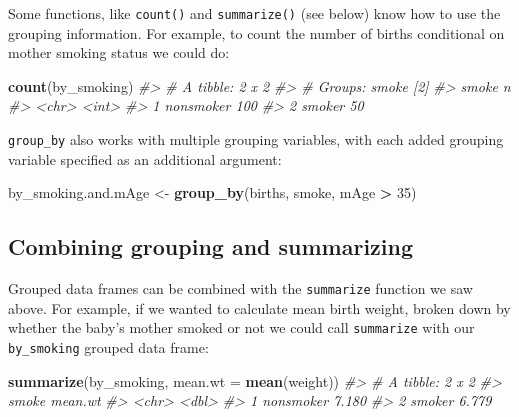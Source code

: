\documentclass[]{book}
\newenvironment{Shaded}{\begin{snugshade}}{\end{snugshade}}
\newcommand{\CommentTok}[1]{\textcolor[rgb]{0.56,0.35,0.01}{\textit{#1}}}
\newcommand{\DataTypeTok}[1]{\textcolor[rgb]{0.13,0.29,0.53}{#1}}
\newcommand{\DecValTok}[1]{\textcolor[rgb]{0.00,0.00,0.81}{#1}}
\newcommand{\KeywordTok}[1]{\textcolor[rgb]{0.13,0.29,0.53}{\textbf{#1}}}
\newcommand{\NormalTok}[1]{#1}
\newcommand{\OperatorTok}[1]{\textcolor[rgb]{0.81,0.36,0.00}{\textbf{#1}}}
\newcommand{\StringTok}[1]{\textcolor[rgb]{0.31,0.60,0.02}{#1}}
\theoremstyle{definition}
\theoremstyle{definition}
\theoremstyle{definition}
\theoremstyle{remark}
\begin{document}
Some functions, like \texttt{count()} and \texttt{summarize()} (see
below) know how to use the grouping information. For example, to count
the number of births conditional on mother smoking status we could do:

\begin{Shaded}
\begin{Highlighting}[]
\KeywordTok{count}\NormalTok{(by_smoking)}
\CommentTok{#> # A tibble: 2 x 2}
\CommentTok{#> # Groups:   smoke [2]}
\CommentTok{#>   smoke         n}
\CommentTok{#>   <chr>     <int>}
\CommentTok{#> 1 nonsmoker   100}
\CommentTok{#> 2 smoker       50}
\end{Highlighting}
\end{Shaded}

\texttt{group\_by} also works with multiple grouping variables, with
each added grouping variable specified as an additional argument:

\begin{Shaded}
\begin{Highlighting}[]
\NormalTok{by_smoking.and.mAge <-}\StringTok{ }\KeywordTok{group_by}\NormalTok{(births, smoke, mAge }\OperatorTok{>}\StringTok{ }\DecValTok{35}\NormalTok{)}
\end{Highlighting}
\end{Shaded}

\hypertarget{combining-grouping-and-summarizing}{%
\subsection{Combining grouping and
summarizing}\label{combining-grouping-and-summarizing}}

Grouped data frames can be combined with the \texttt{summarize} function
we saw above. For example, if we wanted to calculate mean birth weight,
broken down by whether the baby's mother smoked or not we could call
\texttt{summarize} with our \texttt{by\_smoking} grouped data frame:

\begin{Shaded}
\begin{Highlighting}[]
\KeywordTok{summarize}\NormalTok{(by_smoking, }\DataTypeTok{mean.wt =} \KeywordTok{mean}\NormalTok{(weight))}
\CommentTok{#> # A tibble: 2 x 2}
\CommentTok{#>   smoke     mean.wt}
\CommentTok{#>   <chr>       <dbl>}
\CommentTok{#> 1 nonsmoker   7.180}
\CommentTok{#> 2 smoker      6.779}
\end{Highlighting}
\end{Shaded}
\end{document}
